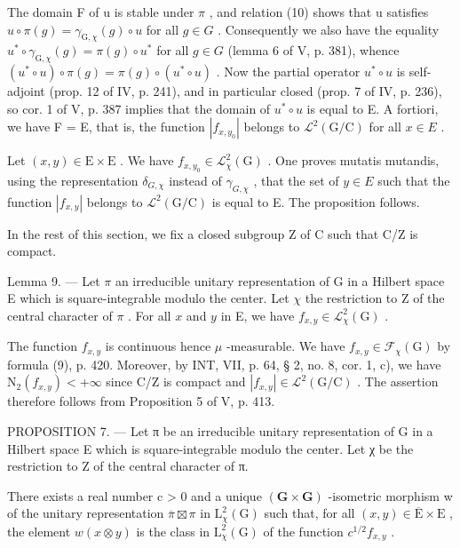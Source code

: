 The domain F of u is stable under \(\pi\) , and relation (10) shows that u satisfies \(u \circ \pi(g) = \gamma_{\mathrm{G},\chi}(g) \circ u\) for all \(g \in G\) . Consequently we also have the equality \(u^{*} \circ \gamma_{\mathrm{G},\chi}(g) = \pi(g) \circ u^{*}\) for all \(g \in G\) (lemma 6 of V, p. 381), whence \((u^{*} \circ u) \circ \pi(g) = \pi(g) \circ (u^{*} \circ u)\) . Now the partial operator \(u^{*} \circ u\) is self-adjoint (prop. 12 of IV, p. 241), and in particular closed (prop. 7 of IV, p. 236), so cor. 1 of V, p. 387 implies that the domain of \(u^{*} \circ u\) is equal to E. A fortiori, we have F = E, that is, the function \(|f_{x,y_{0}}|\) belongs to \(\mathcal{L}^{2}(\mathrm{G}/\mathrm{C})\) for all \(x \in E\) .

Let \((x,y)\in\mathrm{E}\times\mathrm{E}\) . We have \(f_{x,y_{0}}\in\mathcal{L}_{\chi}^{2}(\mathrm{G})\) . One proves mutatis mutandis, using the representation \(\delta_{G,\chi}\) instead of \(\gamma_{G,\chi}\) , that the set of \(y\in E\) such that the function \(|f_{x,y}|\) belongs to \(\mathcal{L}^{2}(\mathrm{G}/\mathrm{C})\) is equal to E. The proposition follows.

In the rest of this section, we fix a closed subgroup Z of C such that C/Z is compact.

Lemma 9. --- Let \(\pi\) an irreducible unitary representation of G in a Hilbert space E which is square-integrable modulo the center. Let \(\chi\) the restriction to Z of the central character of \(\pi\) . For all \(x\) and \(y\) in E, we have \(f_{x,y} \in \mathcal{L}_{\chi}^{2}(\mathrm{G})\) .

 The function \(f_{x,y}\) is continuous hence \(\mu\) -measurable. We have \(f_{x,y} \in \mathcal{F}_{\chi}(\mathrm{G})\) by formula (9), p. 420. Moreover, by INT, VII, p. 64, § 2, no. 8, cor. 1, c), we have \(\mathrm{N}_{2}(f_{x,y}) < +\infty\) since C/Z is compact and \(|f_{x,y}| \in \mathcal{L}^{2}(\mathrm{G}/\mathrm{C})\) . The assertion therefore follows from Proposition 5 of V, p. 413.

PROPOSITION 7. --- Let π be an irreducible unitary representation of G in a Hilbert space E which is square-integrable modulo the center. Let χ be the restriction to Z of the central character of π.

There exists a real number c \textgreater{} 0 and a unique \((\mathbf{G} \times \mathbf{G})\) -isometric morphism w of the unitary representation \(\overline{\pi} \boxtimes \pi\) in \(\mathrm{L}_{\chi}^{2}(\mathrm{G})\) such that, for all \((x, y) \in \overline{\mathrm{E}} \times \mathrm{E}\) , the element \(w(x \otimes y)\) is the class in \(\mathrm{L}_{\chi}^{2}(\mathrm{G})\) of the function \(c^{1/2} f_{x,y}\) .

